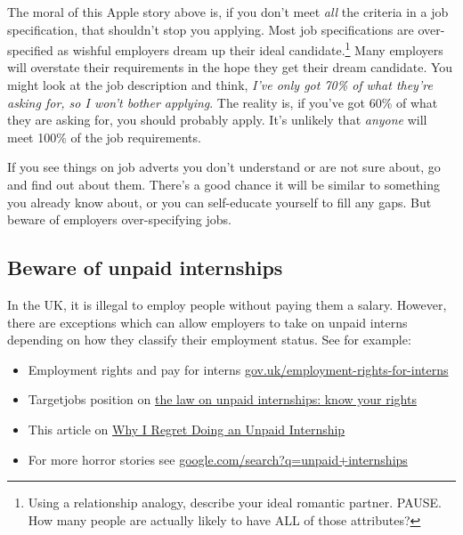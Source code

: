 \documentclass[
]{book}
\providecommand{\tightlist}{%
  \setlength{\itemsep}{0pt}\setlength{\parskip}{0pt}}
\begin{document}
The moral of this Apple story above is, if you don't meet \emph{all} the criteria in a job specification, that shouldn't stop you applying. Most job specifications are over-specified as wishful employers dream up their ideal candidate.\footnote{Using a relationship analogy, describe your ideal romantic partner. PAUSE. How many people are actually likely to have ALL of those attributes?} Many employers will overstate their requirements in the hope they get their dream candidate. You might look at the job description and think, \emph{I've only got 70\% of what they're asking for, so I won't bother applying}. The reality is, if you've got 60\% of what they are asking for, you should probably apply. It's unlikely that \emph{anyone} will meet 100\% of the job requirements.

If you see things on job adverts you don't understand or are not sure about, go and find out about them. There's a good chance it will be similar to something you already know about, or you can self-educate yourself to fill any gaps. But beware of employers over-specifying jobs. 🤣

\hypertarget{unpaid}{%
\subsection{Beware of unpaid internships}\label{unpaid}}

In the UK, it is illegal to employ people without paying them a salary. However, there are exceptions which can allow employers to take on unpaid interns depending on how they classify their employment status. See for example:

\begin{itemize}
\tightlist
\item
  Employment rights and pay for interns \href{https://www.gov.uk/employment-rights-for-interns}{gov.uk/employment-rights-for-interns}
\item
  Targetjobs position on \href{https://targetjobs.co.uk/internships/advice/275017-the-law-on-unpaid-internships-know-your-rights}{the law on unpaid internships: know your rights}
\item
  This article on \href{https://www.ratemyplacement.co.uk/blog/why-i-regret-doing-an-unpaid-internship/}{Why I Regret Doing an Unpaid Internship} \citep{louiseregret}
\item
  For more horror stories see \href{https://www.google.com/search?q=unpaid+internships}{google.com/search?q=unpaid+internships}
\end{itemize}
\end{document}
